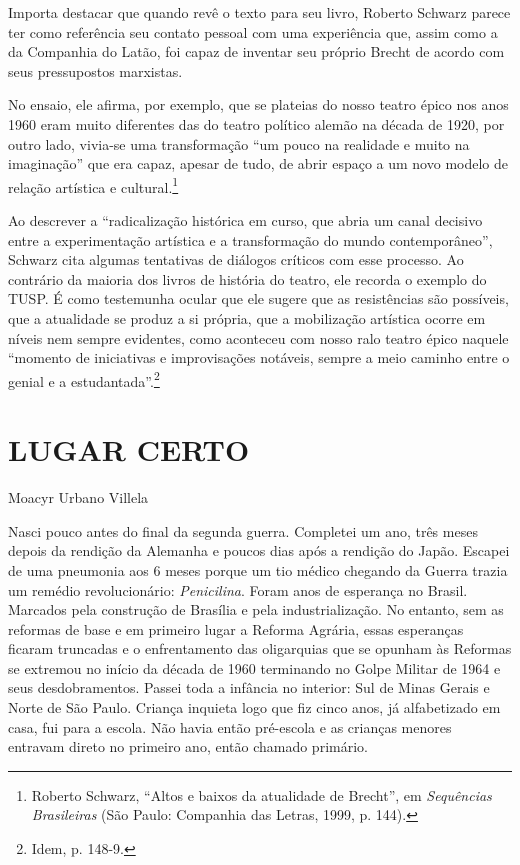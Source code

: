 Importa destacar que quando revê o texto para seu livro, Roberto Schwarz
parece ter como referência seu contato pessoal com uma experiência que,
assim como a da Companhia do Latão, foi capaz de inventar seu próprio
Brecht de acordo com seus pressupostos marxistas.

No ensaio, ele afirma, por exemplo, que se plateias do nosso teatro
épico nos anos 1960 eram muito diferentes das do teatro político alemão
na década de 1920, por outro lado, vivia-se uma transformação “um pouco
na realidade e muito na imaginação” que era capaz, apesar de tudo, de
abrir espaço a um novo modelo de relação artística e
cultural.\footnote{Roberto Schwarz, “Altos e baixos da atualidade de
  Brecht”, em \textit{Sequências Brasileiras} (São Paulo: Companhia das
  Letras, 1999, p. 144).}

Ao descrever a “radicalização histórica em curso, que abria um canal
decisivo entre a experimentação artística e a transformação do mundo
contemporâneo”, Schwarz cita algumas tentativas de diálogos críticos com
esse processo. Ao contrário da maioria dos livros de história do teatro,
ele recorda o exemplo do TUSP. É como testemunha ocular que ele sugere
que as resistências são possíveis, que a atualidade se produz a si
própria, que a mobilização artística ocorre em níveis nem sempre
evidentes, como aconteceu com nosso ralo teatro épico naquele “momento
de iniciativas e improvisações notáveis, sempre a meio caminho entre o
genial e a estudantada”.\footnote{Idem, p. 148-9.}

\chapter{LUGAR CERTO}

Moacyr Urbano Villela

Nasci pouco antes do final da segunda guerra. Completei um ano, três
meses depois da rendição da Alemanha e poucos dias após a rendição do
Japão. Escapei de uma pneumonia aos 6 meses porque um tio médico
chegando da Guerra trazia um remédio revolucionário: \textit{Penicilina}.
Foram anos de esperança no Brasil. Marcados pela construção de Brasília
e pela industrialização. No entanto, sem as reformas de base e em
primeiro lugar a Reforma Agrária, essas esperanças ficaram truncadas e o
enfrentamento das oligarquias que se opunham às Reformas se extremou no
início da década de 1960 terminando no Golpe Militar de 1964 e seus
desdobramentos. Passei toda a infância no interior: Sul de Minas Gerais
e Norte de São Paulo. Criança inquieta logo que fiz cinco anos, já
alfabetizado em casa, fui para a escola. Não havia então pré-escola e as
crianças menores entravam direto no primeiro ano, então chamado
primário.

